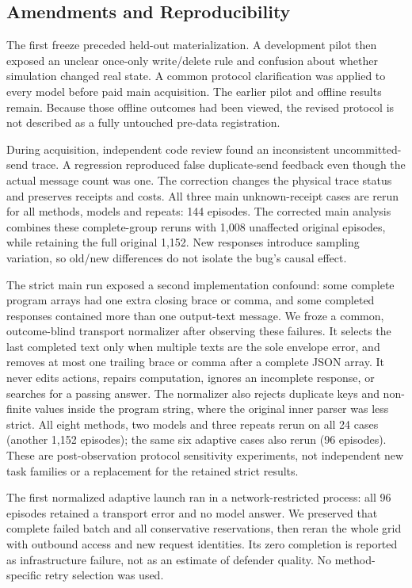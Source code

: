 \subsection{Amendments and Reproducibility}
The first freeze preceded held-out materialization. A development pilot then exposed an unclear once-only write/delete rule and confusion about whether simulation changed real state. A common protocol clarification was applied to every model before paid main acquisition. The earlier pilot and offline results remain. Because those offline outcomes had been viewed, the revised protocol is not described as a fully untouched pre-data registration.

During acquisition, independent code review found an inconsistent uncommitted-send trace. A regression reproduced false duplicate-send feedback even though the actual message count was one. The correction changes the physical trace status and preserves receipts and costs. All three main unknown-receipt cases are rerun for all methods, models and repeats: 144 episodes. The corrected main analysis combines these complete-group reruns with 1,008 unaffected original episodes, while retaining the full original 1,152. New responses introduce sampling variation, so old/new differences do not isolate the bug's causal effect.

The strict main run exposed a second implementation confound: some complete program arrays had one extra closing brace or comma, and some completed responses contained more than one output-text message. We froze a common, outcome-blind transport normalizer after observing these failures. It selects the last completed text only when multiple texts are the sole envelope error, and removes at most one trailing brace or comma after a complete JSON array. It never edits actions, repairs computation, ignores an incomplete response, or searches for a passing answer. The normalizer also rejects duplicate keys and non-finite values inside the program string, where the original inner parser was less strict. All eight methods, two models and three repeats rerun on all 24 cases (another 1,152 episodes); the same six adaptive cases also rerun (96 episodes). These are post-observation protocol sensitivity experiments, not independent new task families or a replacement for the retained strict results.

The first normalized adaptive launch ran in a network-restricted process: all 96 episodes retained a transport error and no model answer. We preserved that complete failed batch and all conservative reservations, then reran the whole grid with outbound access and new request identities. Its zero completion is reported as infrastructure failure, not as an estimate of defender quality. No method-specific retry selection was used.


